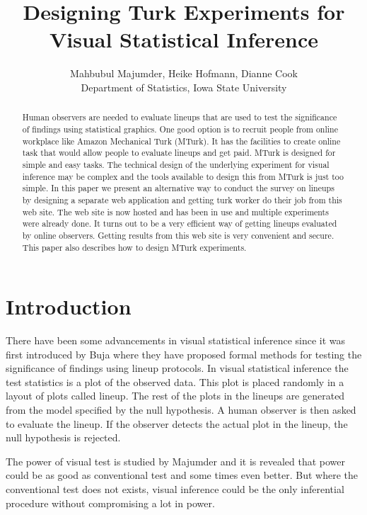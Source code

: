 \documentclass[11pt]{article}
\title{Designing Turk Experiments for Visual Statistical Inference}
\author{Mahbubul Majumder, Heike Hofmann, Dianne Cook\\
        Department of Statistics, Iowa State University}
\begin{document}
\tableofcontents

\maketitle


\begin {abstract} 

Human observers are needed to evaluate lineups that are used to test the significance of findings using statistical graphics. One good option is to recruit people from online workplace like Amazon Mechanical Turk (MTurk). It has the facilities to create online task that would allow people to evaluate lineups and get paid. MTurk is designed for simple and easy tasks. The technical design of the underlying experiment for visual inference may be complex and the tools available to design this from MTurk is just too simple. In this paper we present an alternative way to conduct the survey on lineups by designing a separate web application and getting turk worker do their job from this web site. The web site is now hosted and has been in use and multiple experiments were already done. It turns out to be a very efficient way of getting lineups evaluated by online observers. Getting results from this web site is very convenient and secure. This paper also describes how to design MTurk experiments.

\end {abstract}


\section{Introduction} 

There have been some advancements in visual statistical inference since it was first introduced by Buja \cite{buja:2009} where they have proposed formal methods for testing the significance of findings using lineup protocols. In visual statistical inference the test statistics is a plot of the observed data. This plot is placed randomly in a layout of plots called lineup. The rest of the plots in the lineups are generated from the model specified by the null hypothesis. A human observer is then asked to evaluate the lineup. If the observer detects the actual plot in the lineup, the null hypothesis is rejected.

The power of visual test is studied by Majumder \cite{majumder:2013} and it is revealed that power could be as good as conventional test and some times even better. But where the conventional test does not exists, visual inference could be the only inferential procedure without compromising a lot in power. 
\end{document}
